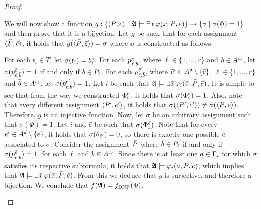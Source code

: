 \begin{proof}
\begin{enumerate}
		We will now show a function $g:\{\langle\P,\e\rangle \mid \A \models \exists\x\,\varphi(\x,\P,\e)\} \to \{\sigma \mid \sigma(\Phi) = 1\}$ and then prove that it is a bijection. Let $g$ be such that for each assignment $\langle \P,\e \rangle$, it holds that $g(\langle \P,\e \rangle) = \sigma$ where $\sigma$ is constructed as follows:
		
		For each $t_i\in T$, let $\sigma(t_i) = b^{\e}_i$. For each $p_{\ell,\b}^{\e}$, where $\ell\in\{1,\ldots,r\}$ and $\b\in A^{c_{\ell}}$, let $\sigma(p_{\ell,\b}^{\e}) = 1$ if and only if $\b \in P_{\ell}$. For each $p_{\ell,\b}^{\e'}$, where $\e'\in A^d\setminus\{\e\}$,  $\ell\in\{1,\ldots,r\}$ and $\b\in A^{c_{\ell}}$, let $\sigma(p_{\ell,\b}^{\e'}) = 1$. Let $i$ be such that $\A\models \exists\x\,\varphi_i(\x,\P,\e)$. It is simple to see that from the way we constructed $\Phi_i^{\e}$, it holds that $\sigma(\Phi_i^{\e}) = 1$. Also, note that every different assignment $\langle \P',\e' \rangle$, it holds that $\sigma(\langle \P',\e' \rangle) \neq \sigma(\langle \P,\e \rangle)$. Therefore, $g$ is an injective function. Now, let $\sigma$ be an arbitrary assignment such that $\sigma(\Phi) = 1$. Let $i$ and $\e$ be such that $\sigma(\Phi^{\e}_i)$. Note that for every $\e'\in A^d\setminus\{\e\}$, it holds that $\sigma(\theta_{\e'}) = 0$, so there is exactly one possible $\e$ associated to $\sigma$. Consider the assignment $\P$ where $\b\in P_{\ell}$ if and only if $\sigma(p^{\e}_{\ell,\b}) = 1$, for each $\ell$ and $\b \in A^{c_{\ell}}$. Since there is at least one $\a\in\Gamma_i$ for which $\sigma$ satisfies its respective subformula, it holds that $\A\models\varphi_i(\a,\P,\e)$, which implies that $\A\models\exists\x\,\varphi(\x,\P,\e)$. From this we deduce that $g$ is surjective, and therefore a bijection. We conclude that $f(\A) = f_{\textsc{DNF}}(\Phi)$.
	\end{enumerate}
\end{proof}